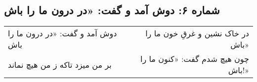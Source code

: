 \begin{center}
\section*{شماره ۶: دوش آمد و گفت: «در درون ما را باش}
\label{sec:006}
\begin{longtable}{l p{0.5cm} r}
دوش آمد و گفت: «در درون ما را باش
&&
در خاک نشین و غرقِ خون ما را باش»
\\
بر من میزد تاکه ز من هیچ نماند
&&
چون هیچ شدم گفت: «کنون ما را باش!»
\\
\end{longtable}
\end{center}
